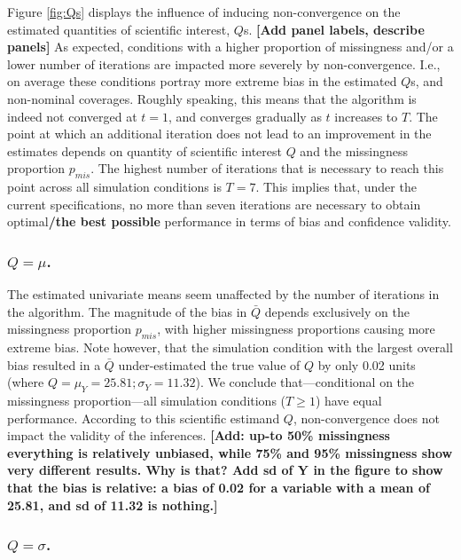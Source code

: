 \documentclass[Royal,times,sageh]{sagej}
\begin{document}
Figure \ref{fig:Qs} displays the influence of inducing non-convergence on the estimated quantities of scientific interest, \(Q\)s. \textbf{{[}Add panel labels, describe panels{]}} As expected, conditions with a higher proportion of missingness and/or a lower number of iterations are impacted more severely by non-convergence. I.e., on average these conditions portray more extreme bias in the estimated \(Q\)s, and non-nominal coverages. Roughly speaking, this means that the algorithm is indeed not converged at \(t=1\), and converges gradually as \(t\) increases to \(T\). The point at which an additional iteration does not lead to an improvement in the estimates depends on quantity of scientific interest \(Q\) and the missingness proportion \(p_{mis}\). The highest number of iterations that is necessary to reach this point across all simulation conditions is \(T=7\). This implies that, under the current specifications, no more than seven iterations are necessary to obtain optimal\textbf{/the best possible} performance in terms of bias and confidence validity.

\hypertarget{qmu.}{%
\subsubsection{\texorpdfstring{\(Q=\mu\).}{Q=\textbackslash mu.}}\label{qmu.}}

The estimated univariate means seem unaffected by the number of iterations in the algorithm. The magnitude of the bias in \(\bar{Q}\) depends exclusively on the missingness proportion \(p_{mis}\), with higher missingness proportions causing more extreme bias. Note however, that the simulation condition with the largest overall bias resulted in a \(\bar{Q}\) under-estimated the true value of \(Q\) by only 0.02 units (where \(Q=\mu_Y=25.81; \sigma_Y = 11.32\)). We conclude that---conditional on the missingness proportion---all simulation conditions (\(T \geq 1\)) have equal performance. According to this scientific estimand \(Q\), non-convergence does not impact the validity of the inferences. \textbf{{[}Add: up-to 50\% missingness everything is relatively unbiased, while 75\% and 95\% missingness show very different results. Why is that? Add sd of Y in the figure to show that the bias is relative: a bias of 0.02 for a variable with a mean of 25.81, and sd of 11.32 is nothing.{]}}

\hypertarget{qsigma.}{%
\subsubsection{\texorpdfstring{\(Q=\sigma\).}{Q=\textbackslash sigma.}}\label{qsigma.}}
\end{document}

